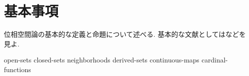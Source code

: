\documentclass[uplatex, dvipdfmx, a4paper, 12pt, class=jsbook, crop=false]{standalone}
\begin{document}
\chapter{基本事項}
\label{chap:basics}

位相空間論の基本的な定義と命題について述べる.
基本的な文献としては\cite{Engelking1989GT, Dugundji1966T, Morita1981ja, KodamaNagami1974ja}などを見よ.

{open-sets}
{closed-sets}
{neighborhoods}
{derived-sets}
{continuous-maps}
{cardinal-functions}
\end{document}
